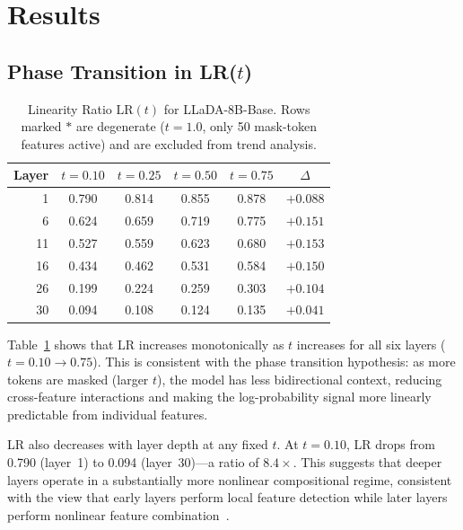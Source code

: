 \documentclass{article}
\newcommand{\LR}{\mathrm{LR}}
\begin{document}
\section{Results}

\subsection{Phase Transition in LR($t$)}

\begin{table}[t]
\centering
\caption{Linearity Ratio $\LR(t)$ for LLaDA-8B-Base. Rows marked $*$ are degenerate ($t = 1.0$, only 50 mask-token features active) and are excluded from trend analysis.}
\label{tab:lr_dlm}
\vskip 0.1in
\begin{small}
\begin{sc}
\begin{tabular}{r cccc c}
\toprule
\textbf{Layer} & $t{=}0.10$ & $t{=}0.25$ & $t{=}0.50$ & $t{=}0.75$ & $\Delta$ \\
\midrule
1  & 0.790 & 0.814 & 0.855 & 0.878 & $+0.088$ \\
6  & 0.624 & 0.659 & 0.719 & 0.775 & $+0.151$ \\
11 & 0.527 & 0.559 & 0.623 & 0.680 & $+0.153$ \\
16 & 0.434 & 0.462 & 0.531 & 0.584 & $+0.150$ \\
26 & 0.199 & 0.224 & 0.259 & 0.303 & $+0.104$ \\
30 & 0.094 & 0.108 & 0.124 & 0.135 & $+0.041$ \\
\bottomrule
\end{tabular}
\end{sc}
\end{small}
\end{table}

Table~\ref{tab:lr_dlm} shows that LR increases monotonically as $t$ increases for all six layers ($t = 0.10 \to 0.75$).
This is consistent with the phase transition hypothesis: as more tokens are masked (larger $t$), the model has less bidirectional context, reducing cross-feature interactions and making the log-probability signal more linearly predictable from individual features.

LR also decreases with layer depth at any fixed $t$. At $t = 0.10$, LR drops from 0.790 (layer~1) to 0.094 (layer~30)---a ratio of $8.4\times$. This suggests that deeper layers operate in a substantially more nonlinear compositional regime, consistent with the view that early layers perform local feature detection while later layers perform nonlinear feature combination~\citep{elhage2021mathematical}.
\end{document}
